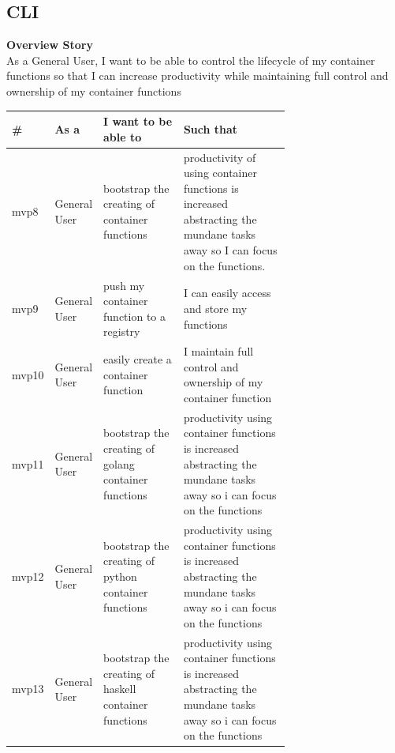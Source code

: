\subsection{CLI}
\textbf{Overview Story}
\\ As a General User, I want to be able to control the lifecycle of my container functions so that I can increase productivity while maintaining full control and ownership of my container functions

\begin{table}[!ht]
\begin{tabular}{|l|l|p{0.3\linewidth}|p{0.4\linewidth}|}
\hline
\textbf{\#} & \textbf{As a} & \textbf{I want to be able to}                         & \textbf{Such that}                                                                                                         \\ \hline
mvp8        & General User  & bootstrap the creating of container functions         & productivity of using container functions is increased abstracting the mundane tasks away so I can focus on the functions. \\ \hline
mvp9        & General User  & push my container function to a registry              & I can easily access and store my functions                                                                                 \\ \hline
mvp10       & General User  & easily create a container function                    & I maintain full control and ownership of my container function                                                             \\ \hline
mvp11       & General User  & bootstrap the creating of golang container functions  & productivity using container functions is increased abstracting the mundane tasks away so i can focus on the functions     \\ \hline
mvp12       & General User  & bootstrap the creating of python container functions  & productivity using container functions is increased abstracting the mundane tasks away so i can focus on the functions     \\ \hline
mvp13       & General User  & bootstrap the creating of haskell container functions & productivity using container functions is increased abstracting the mundane tasks away so i can focus on the functions     \\ \hline
\end{tabular}
\end{table}

